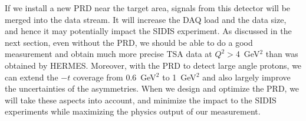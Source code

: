 If we install a new PRD near the target area, signals from this detector will be merged into
the data stream. It will increase the DAQ load and the data
size, and hence it may potentially impact the SIDIS experiment.  As discussed in
the next section, even without the PRD, we should be able to do a good
measurement and obtain much more precise TSA data at $Q^{2}>$4~GeV$^{2}$ than
was obtained by HERMES.  Moreover, with the PRD to detect large angle protons,
we can extend the $-t$ coverage from 0.6~GeV$^{2}$ to 1~GeV$^{2}$ and also
largely improve the uncertainties of the asymmetries. When we design and
optimize the PRD, we will take these aspects into account, and minimize the
impact to the SIDIS experiments while maximizing the physics output of our
measurement.
